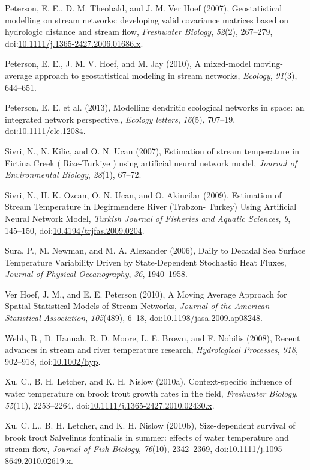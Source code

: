 Peterson, E. E., D. M. Theobald, and J. M. {Ver Hoef} (2007),
Geostatistical modelling on stream networks: developing valid covariance
matrices based on hydrologic distance and stream flow, \emph{Freshwater
Biology}, \emph{52}(2), 267--279,
doi:\href{http://dx.doi.org/10.1111/j.1365-2427.2006.01686.x}{10.1111/j.1365-2427.2006.01686.x}.

Peterson, E. E., J. M. V. Hoef, and M. Jay (2010), A mixed-model
moving-average approach to geostatistical modeling in stream networks,
\emph{Ecology}, \emph{91}(3), 644--651.

Peterson, E. E. et al. (2013), Modelling dendritic ecological networks
in space: an integrated network perspective., \emph{Ecology letters},
\emph{16}(5), 707--19,
doi:\href{http://dx.doi.org/10.1111/ele.12084}{10.1111/ele.12084}.

Sivri, N., N. Kilic, and O. N. Ucan (2007), Estimation of stream
temperature in Firtina Creek ( Rize-Turkiye ) using artificial neural
network model, \emph{Journal of Environmental Biology}, \emph{28}(1),
67--72.

Sivri, N., H. K. Ozcan, O. N. Ucan, and O. Akincilar (2009), Estimation
of Stream Temperature in Degirmendere River (Trabzon- Turkey) Using
Artificial Neural Network Model, \emph{Turkish Journal of Fisheries and
Aquatic Sciences}, \emph{9}, 145--150,
doi:\href{http://dx.doi.org/10.4194/trjfas.2009.0204}{10.4194/trjfas.2009.0204}.

Sura, P., M. Newman, and M. A. Alexander (2006), Daily to Decadal Sea
Surface Temperature Variability Driven by State-Dependent Stochastic
Heat Fluxes, \emph{Journal of Physical Oceanography}, \emph{36},
1940--1958.

{Ver Hoef}, J. M., and E. E. Peterson (2010), A Moving Average Approach
for Spatial Statistical Models of Stream Networks, \emph{Journal of the
American Statistical Association}, \emph{105}(489), 6--18,
doi:\href{http://dx.doi.org/10.1198/jasa.2009.ap08248}{10.1198/jasa.2009.ap08248}.

Webb, B., D. Hannah, R. D. Moore, L. E. Brown, and F. Nobilis (2008),
Recent advances in stream and river temperature research,
\emph{Hydrological Processes}, \emph{918}, 902--918,
doi:\href{http://dx.doi.org/10.1002/hyp}{10.1002/hyp}.

Xu, C., B. H. Letcher, and K. H. Nislow (2010a), Context-specific
influence of water temperature on brook trout growth rates in the field,
\emph{Freshwater Biology}, \emph{55}(11), 2253--2264,
doi:\href{http://dx.doi.org/10.1111/j.1365-2427.2010.02430.x}{10.1111/j.1365-2427.2010.02430.x}.

Xu, C. L., B. H. Letcher, and K. H. Nislow (2010b), Size-dependent
survival of brook trout Salvelinus fontinalis in summer: effects of
water temperature and stream flow, \emph{Journal of Fish Biology},
\emph{76}(10), 2342--2369,
doi:\href{http://dx.doi.org/10.1111/j.1095-8649.2010.02619.x}{10.1111/j.1095-8649.2010.02619.x}.
